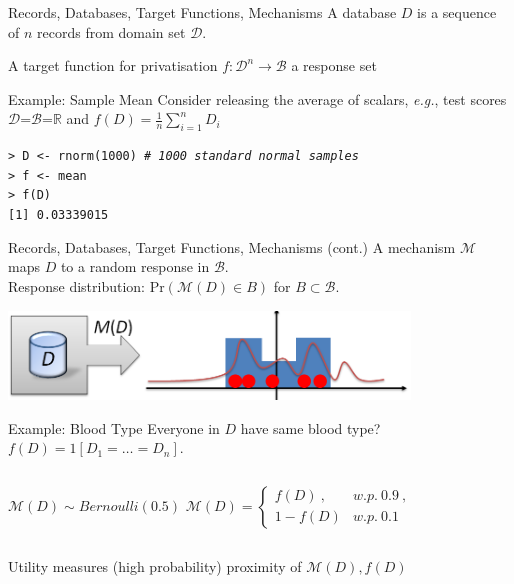 \documentclass{beamer}
\newcommand{\reals}{\ensuremath{\mathbb{R}}\xspace}
\newcommand{\cB}{\ensuremath{\mathcal{B}}\xspace}
\newcommand{\cD}{\ensuremath{\mathcal{D}}\xspace}
\newcommand{\mech}{\ensuremath{\mathcal{M}}\xspace}
\newcommand{\domain}{\ensuremath{\cD}\xspace}
\newcommand{\eg}{\emph{e.g.},\xspace}
\renewcommand{\Pr}[1]{\ensuremath{\mathrm{Pr}\left(#1\right)}}
\begin{document}
\begin{frame}{Records, Databases, Target Functions, Mechanisms}
A \alert{database} $D$ is a sequence of $n$ \alert{records} from \alert{domain} set \domain.

A \alert{target function} for privatisation $f: \cD^n \to \cB$ a \alert{response set}


\begin{exampleblock}{Example: Sample Mean}
Consider releasing the average of scalars, \eg test scores \\
\domain=\cB=\reals and $f(D)=\frac{1}{n}\sum_{i=1}^n D_i$
\end{exampleblock}

\texttt{> D <- rnorm(1000) \textit{\# 1000 standard normal samples}}\\
\texttt{> f <- mean}\\
\texttt{> f(D)} \\
\texttt{[1] 0.03339015}

\end{frame}

\begin{frame}{Records, Databases, Target Functions, Mechanisms (cont.)}
A \alert{mechanism} $\mech$ maps $D$ to a \alert{random response} in \cB. \\
\alert{Response distribution}: $\Pr{\mech(D)\in B}$ for $B\subset\cB$. 

\begin{center}\includegraphics[width=0.8\textwidth]{figures/mechanism}\end{center}

\pause
\begin{exampleblock}{Example: Blood Type}
Everyone in $D$ have same blood type?  $f(D) = 1[D_1=\ldots=D_n]$. \\
\begin{columns}[T,onlytextwidth]
\vspace{1.3em}
$\mech(D)\sim Bernoulli(0.5)$
$\mech(D) = \begin{cases} f(D)\ , & w.p.\ 0.9\ , \\ 1 - f(D) & w.p.\ 0.1 \end{cases}$
\end{columns}
\end{exampleblock}

\alert{Utility} measures (high probability) proximity of $\mech(D), f(D)$


\end{frame}
\end{document}
